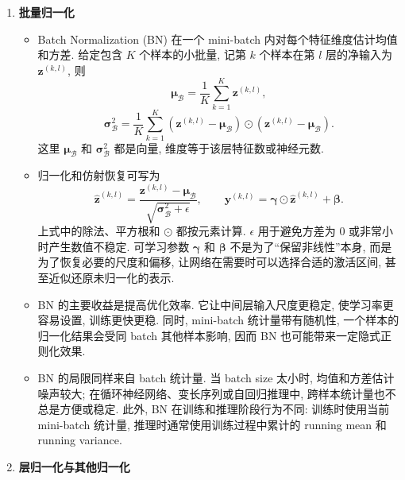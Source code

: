 \documentclass{../nndlcourse}
\begin{document}
\begin{enumerate}
\begin{itemize}
      \item 常见中间层归一化包括 Batch Normalization, Layer Normalization, Weight Normalization 和早期 CNN 中使用过的 Local Response Normalization. 它们的关键差别在于: 统计量沿哪些维度计算, 训练和推理阶段是否一致, 以及是否依赖同一 batch 中的其他样本.
    \end{itemize}
  \item \textbf{批量归一化}
    \begin{itemize}
      \item Batch Normalization (BN) 在一个 mini-batch 内对每个特征维度估计均值和方差. 给定包含 $K$ 个样本的小批量, 记第 $k$ 个样本在第 $l$ 层的净输入为 $\boldsymbol{z}^{(k,l)}$, 则
      \[
        \boldsymbol{\mu}_{\mathcal{B}}
        =
        \frac{1}{K}\sum_{k=1}^{K}\boldsymbol{z}^{(k,l)},
      \]
      \[
        \boldsymbol{\sigma}_{\mathcal{B}}^2
        =
        \frac{1}{K}\sum_{k=1}^{K}
        \left(\boldsymbol{z}^{(k,l)}-\boldsymbol{\mu}_{\mathcal{B}}\right)
        \odot
        \left(\boldsymbol{z}^{(k,l)}-\boldsymbol{\mu}_{\mathcal{B}}\right).
      \]
      这里 $\boldsymbol{\mu}_{\mathcal{B}}$ 和 $\boldsymbol{\sigma}_{\mathcal{B}}^2$ 都是向量, 维度等于该层特征数或神经元数.
      \item 归一化和仿射恢复可写为
      \[
        \hat{\boldsymbol{z}}^{(k,l)}
        =
        \frac{\boldsymbol{z}^{(k,l)}-\boldsymbol{\mu}_{\mathcal{B}}}
        {\sqrt{\boldsymbol{\sigma}_{\mathcal{B}}^2+\epsilon}},
        \qquad
        \boldsymbol{y}^{(k,l)}
        =
        \boldsymbol{\gamma}\odot\hat{\boldsymbol{z}}^{(k,l)}
        +
        \boldsymbol{\beta}.
      \]
      上式中的除法、平方根和 $\odot$ 都按元素计算. $\epsilon$ 用于避免方差为 $0$ 或非常小时产生数值不稳定. 可学习参数 $\boldsymbol{\gamma}$ 和 $\boldsymbol{\beta}$ 不是为了“保留非线性”本身, 而是为了恢复必要的尺度和偏移, 让网络在需要时可以选择合适的激活区间, 甚至近似还原未归一化的表示.
      \item BN 的主要收益是提高优化效率. 它让中间层输入尺度更稳定, 使学习率更容易设置, 训练更快更稳. 同时, mini-batch 统计量带有随机性, 一个样本的归一化结果会受同 batch 其他样本影响, 因而 BN 也可能带来一定隐式正则化效果.
      \item BN 的局限同样来自 batch 统计量. 当 batch size 太小时, 均值和方差估计噪声较大; 在循环神经网络、变长序列或自回归推理中, 跨样本统计量也不总是方便或稳定. 此外, BN 在训练和推理阶段行为不同: 训练时使用当前 mini-batch 统计量, 推理时通常使用训练过程中累计的 running mean 和 running variance.
    \end{itemize}
  \item \textbf{层归一化与其他归一化}

\end{enumerate}
\end{document}

